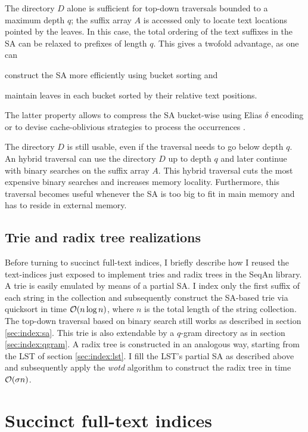 The directory $D$ alone is sufficient for top-down traversals bounded to a maximum depth $q$;
the suffix array $A$ is accessed only to locate text locations pointed by the leaves.
In this case, the total ordering of the text suffixes in the SA can be relaxed to prefixes of length $q$.
This gives a twofold advantage, as one can
\begin{inparaenum}[(i)]
\item construct the SA more efficiently using bucket sorting and
\item maintain leaves in each bucket sorted by their relative text positions.
\end{inparaenum}
The latter property allows to compress the SA bucket-wise \eg using Elias $\delta$ encoding \citep{Elias1975} or to devise cache-oblivious strategies to process the occurrences \citep{Hach2010}.

The directory $D$ is still usable, even if the traversal needs to go below depth $q$.
An hybrid traversal can use the directory $D$ up to depth $q$ and later continue with binary searches on the suffix array $A$.
This hybrid traversal cuts the most expensive binary searches and increases memory locality.
Furthermore, this traversal becomes useful whenever the SA is too big to fit in main memory and has to reside in external memory.

\subsection{Trie and radix tree realizations}
\label{sec:index:trie}

Before turning to succinct full-text indices, I briefly describe how I reused the text-indices just exposed to implement tries and radix trees in the SeqAn library.
A trie is easily emulated by means of a partial SA.
I index only the first suffix of each string in the collection and subsequently construct the SA-based trie via quicksort in time $\mathcal{O}(n \log n)$, where $n$ is the total length of the string collection.
The top-down traversal based on binary search still works as described in section \ref{sec:index:sa}.
This trie is also extendable by a $q$-gram directory as in section \ref{sec:index:qgram}.
A radix tree is constructed in an analogous way, starting from the LST of section \ref{sec:index:lst}.
I fill the LST's partial SA as described above and subsequently apply the \emph{wotd} algorithm \citep{Giegerich1999} to construct the radix tree in time $\mathcal{O}(\sigma n)$.


\section{Succinct full-text indices}

